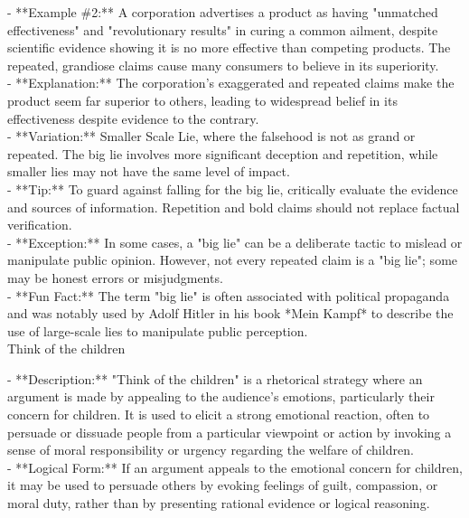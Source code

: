 \documentclass[a4paper,12pt,single,pdftex]{scrbook}
\begin{document}
    
      - **Example \#2:** A corporation advertises a product as having "unmatched effectiveness" and "revolutionary results" in curing a common ailment, despite scientific evidence showing it is no more effective than competing products. The repeated, grandiose claims cause many consumers to believe in its superiority.
    \\

    
      - **Explanation:** The corporation’s exaggerated and repeated claims make the product seem far superior to others, leading to widespread belief in its effectiveness despite evidence to the contrary.
    \\

    
      - **Variation:** Smaller Scale Lie, where the falsehood is not as grand or repeated. The big lie involves more significant deception and repetition, while smaller lies may not have the same level of impact.
    \\

    
      - **Tip:** To guard against falling for the big lie, critically evaluate the evidence and sources of information. Repetition and bold claims should not replace factual verification.
    \\

    
      - **Exception:** In some cases, a "big lie" can be a deliberate tactic to mislead or manipulate public opinion. However, not every repeated claim is a "big lie"; some may be honest errors or misjudgments.
    \\

    
      - **Fun Fact:** The term "big lie" is often associated with political propaganda and was notably used by Adolf Hitler in his book *Mein Kampf* to describe the use of large-scale lies to manipulate public perception.
    \\

  

Think of the children
    
      - **Description:** "Think of the children" is a rhetorical strategy where an argument is made by appealing to the audience’s emotions, particularly their concern for children. It is used to elicit a strong emotional reaction, often to persuade or dissuade people from a particular viewpoint or action by invoking a sense of moral responsibility or urgency regarding the welfare of children.
    \\

    
      - **Logical Form:** If an argument appeals to the emotional concern for children, it may be used to persuade others by evoking feelings of guilt, compassion, or moral duty, rather than by presenting rational evidence or logical reasoning.
    \\
\end{document}
